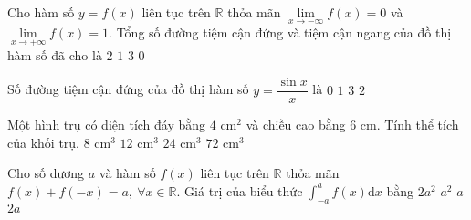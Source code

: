 \begin{ex}%
	Cho hàm số $y=f(x)$ liên tục trên $\mathbb{R}$ thỏa mãn $\lim\limits_{x \to -\infty} f(x)=0$ và $\lim\limits_{x \to +\infty} f(x)=1$. Tổng số đường tiệm cận đứng và tiệm cận ngang của đồ thị hàm số đã cho là	
	\choice
	{\True $2$}
	{$1$}
	{$3$}
	{$0$}
\end{ex}
\begin{ex}%
	Số đường tiệm cận đứng của đồ thị hàm số $y=\dfrac{\sin x}{x}$ là
	\choice
	{\True $0$}
	{$1$}
	{$3$}
	{$2$}
\end{ex}
\begin{ex}%
	Một hình trụ có diện tích đáy bằng $4$ cm$^2$ và chiều cao bằng $6$ cm. Tính thể tích của khối trụ.	
	\choice
	{$8$ cm$^3$}
	{$12$ cm$^3$}
	{\True $24$ cm$^3$}
	{$72$ cm$^3$}
\end{ex}
\begin{ex}%
	Cho số dương $a$ và hàm số $f(x)$ liên tục trên $\mathbb{R}$ thỏa mãn $f(x)+f(-x)=a,\ \forall x \in \mathbb{R}$. Giá trị của biểu thức $\displaystyle\int_{-a}^{a}f(x)\mathrm{d}x$ bằng
	\choice
	{$2a^2$}
	{\True $a^2$}
	{$a$}
	{$2a$}
\end{ex}
